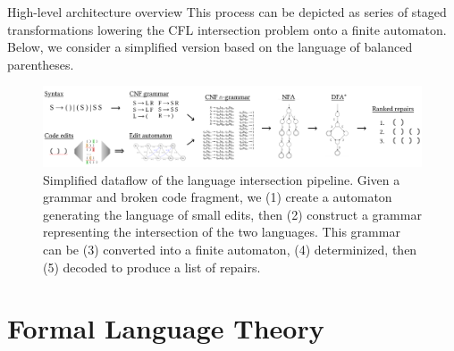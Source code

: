 \documentclass{beamer}
\begin{document}
\begin{frame}[fragile]{High-level architecture overview}
This process can be depicted as series of staged transformations lowering the CFL intersection problem onto a finite automaton. Below, we consider a simplified version based on the language of balanced parentheses.

\vspace{0.3cm}
\begin{figure}[H]
\centering
\includegraphics[width=\textwidth]{flow_short}
\vspace{0.1cm}
\caption{Simplified dataflow of the language intersection pipeline. Given a grammar and broken code fragment, we (1) create a automaton generating the language of small edits, then (2) construct a grammar representing the intersection of the two languages. This grammar can be (3) converted into a finite automaton, (4) determinized, then (5) decoded to produce a list of repairs.}
\label{fig:exampleDFA}
\end{figure}
\end{frame}

\section{Formal Language Theory}\label{sec:fltheory}

\end{document}
